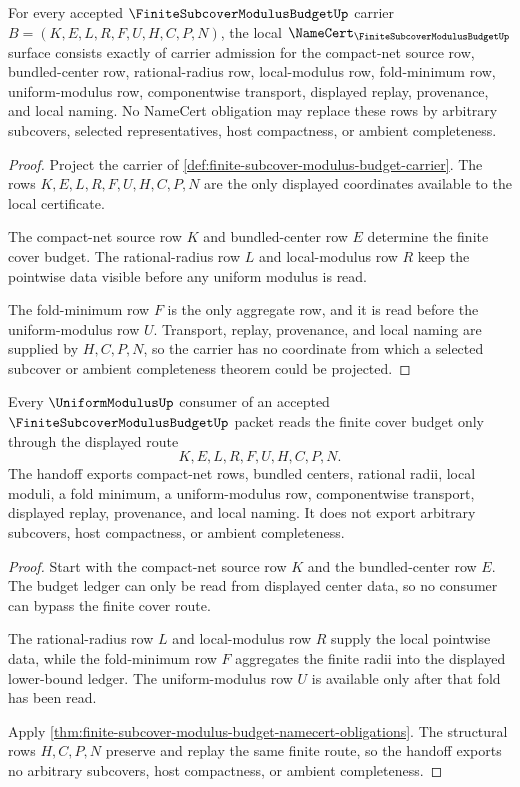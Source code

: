 \begin{theorem}
\label{thm:finite-subcover-modulus-budget-namecert-obligations}
For every accepted $\FiniteSubcoverModulusBudgetUp$ carrier $B=(K,E,L,R,F,U,H,C,P,N)$, the local $\NameCert_{\FiniteSubcoverModulusBudgetUp}$ surface consists exactly of carrier admission for the compact-net source row, bundled-center row, rational-radius row, local-modulus row, fold-minimum row, uniform-modulus row, componentwise transport, displayed replay, provenance, and local naming. No NameCert obligation may replace these rows by arbitrary subcovers, selected representatives, host compactness, or ambient completeness.
\end{theorem}
\begin{proof}
Project the carrier of \autoref{def:finite-subcover-modulus-budget-carrier}. The rows $K,E,L,R,F,U,H,C,P,N$ are the only displayed coordinates available to the local certificate.

The compact-net source row $K$ and bundled-center row $E$ determine the finite cover budget. The rational-radius row $L$ and local-modulus row $R$ keep the pointwise data visible before any uniform modulus is read.

The fold-minimum row $F$ is the only aggregate row, and it is read before the uniform-modulus row $U$. Transport, replay, provenance, and local naming are supplied by $H,C,P,N$, so the carrier has no coordinate from which a selected subcover or ambient completeness theorem could be projected.
\end{proof}

\begin{theorem}
\label{thm:finite-subcover-modulus-budget-uniform-modulus-handoff}
Every $\UniformModulusUp$ consumer of an accepted $\FiniteSubcoverModulusBudgetUp$ packet reads the finite cover budget only through the displayed route
$$
K,E,L,R,F,U,H,C,P,N .
$$
The handoff exports compact-net rows, bundled centers, rational radii, local moduli, a fold minimum, a uniform-modulus row, componentwise transport, displayed replay, provenance, and local naming. It does not export arbitrary subcovers, host compactness, or ambient completeness.
\end{theorem}
\begin{proof}
Start with the compact-net source row $K$ and the bundled-center row $E$. The budget ledger can only be read from displayed center data, so no consumer can bypass the finite cover route.

The rational-radius row $L$ and local-modulus row $R$ supply the local pointwise data, while the fold-minimum row $F$ aggregates the finite radii into the displayed lower-bound ledger. The uniform-modulus row $U$ is available only after that fold has been read.

Apply \autoref{thm:finite-subcover-modulus-budget-namecert-obligations}. The structural rows $H,C,P,N$ preserve and replay the same finite route, so the handoff exports no arbitrary subcovers, host compactness, or ambient completeness.
\end{proof}

